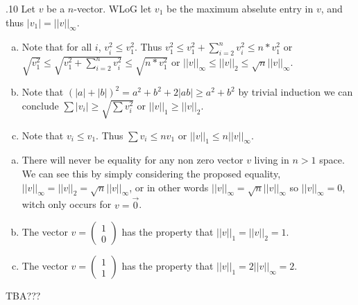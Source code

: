 \documentclass[12pt]{article}
\makeatletter
\theoremstyle{homework}
\newenvironment{exercise}[1]
{\def\@currentlabel{#1}\exercisecore}
{\endexercisecore}
\makeatother
\begin{document}
\begin{exercise}

7.10
\end{exercise}
Let $v$ be a $n$-vector.  WLoG let $v_1$ be the maximum abselute entry in $v$, and thus $|v_1|=||v||_\infty$.
\begin{enumerate}[(a)]
\item
Note that for all $i$, $v_i^2\leq v_1^2$.  Thus $v_1^2\leq v_1^2 + \sum_{i=2}^n v_i^2\leq n*v_1^2$ or $\sqrt{v_1^2}\leq \sqrt{v_1^2 + \sum_{i=2}^n v_i^2}\leq \sqrt{n*v_1^2}$ or $||v||_\infty\leq ||v||_2 \leq \sqrt{n}||v||_\infty$.
\item
Note that $(|a|+|b|)^2=a^2+b^2+2|ab|\geq a^2+b^2$  by trivial induction we can conclude $\sum |v_i|\geq \sqrt{\sum v_i^2}$ or $||v||_1\geq ||v||_2$.
\item
Note that $v_i\leq v_1$.  Thus $\sum v_i\leq nv_1$ or $||v||_1\leq n||v||_\infty$.
\end{enumerate}
\begin{enumerate}[(a)]
\item
There will never be equality for any non zero vector $v$ living in $n>1$ space.  We can see this by simply considering the proposed equality, $||v||_\infty= ||v||_2 = \sqrt{n}||v||_\infty$, or in other words $||v||_\infty= \sqrt{n}||v||_\infty$ so $||v||_\infty=0$, witch only occurs for $v=\vec{0}$.
\item
The vector $v=\begin{pmatrix}
1\\0
\end{pmatrix}$ has the property that $||v||_1= ||v||_2= 1$.
\item
The vector $v=\begin{pmatrix}
1\\1
\end{pmatrix}$ has the property that $||v||_1= 2||v||_\infty=2$.
\end{enumerate}
\begin{exercise}

4
\end{exercise}





\begin{exercise}

5
\end{exercise}
TBA???
\end{document}
